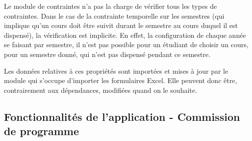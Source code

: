 Le module de contraintes n'a pas la charge de vérifier tous les types de contraintes. Dans le cas de la contrainte temporelle sur les semestres (qui implique qu'un cours doit être suivit durant le semestre au cours duquel il est dispensé), la vérification est implicite. En effet, la configuration de chaque année se faisant par semestre, il n'est pas possible pour un étudiant de choisir un cours, pour un semestre donné, qui n'est pas dispensé pendant ce semestre. 

Les données relatives à ces propriétés sont importées et mises à jour par le module qui s'occupe d'importer les formulaires Excel. Elle peuvent donc être, contrairement aux dépendances, modifiées quand on le souhaite.  


\clearpage
\subsection{Fonctionnalités de l'application - Commission de programme}
